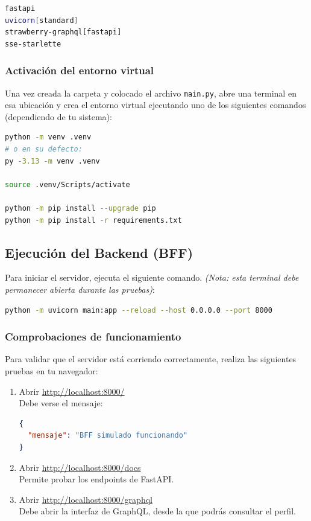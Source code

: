 \begin{lstlisting}[language=bash, caption={requirements.txt}]
fastapi
uvicorn[standard]
strawberry-graphql[fastapi]
sse-starlette
\end{lstlisting}

\subsubsection{Activación del entorno virtual}
Una vez creada la carpeta y colocado el archivo \texttt{main.py}, abre una terminal en esa ubicación y crea el entorno virtual ejecutando uno de los siguientes comandos (dependiendo de tu sistema):

\begin{lstlisting}[language=bash, caption={Creación y activación del entorno virtual}]
python -m venv .venv  
# o en su defecto:
py -3.13 -m venv .venv

source .venv/Scripts/activate

python -m pip install --upgrade pip
python -m pip install -r requirements.txt
\end{lstlisting}

\subsection{Ejecución del Backend (BFF)}
Para iniciar el servidor, ejecuta el siguiente comando. \textit{(Nota: esta terminal debe permanecer abierta durante las pruebas)}:

\begin{lstlisting}[language=bash, caption={Ejecución del servidor FastAPI}]
python -m uvicorn main:app --reload --host 0.0.0.0 --port 8000
\end{lstlisting}

\subsubsection{Comprobaciones de funcionamiento}
Para validar que el servidor está corriendo correctamente, realiza las siguientes pruebas en tu navegador:

\begin{enumerate}
    \item Abrir \url{http://localhost:8000/} \\
    Debe verse el mensaje: 
    \begin{lstlisting}[language=json, caption={Respuesta esperada del servidor}]
{
  "mensaje": "BFF simulado funcionando"
}
    \end{lstlisting}
    
    \item Abrir \url{http://localhost:8000/docs} \\
    Permite probar los endpoints de FastAPI.
    
    \item Abrir \url{http://localhost:8000/graphql} \\
    Debe abrir la interfaz de GraphQL, desde la que podrás consultar el perfil.
\end{enumerate}


